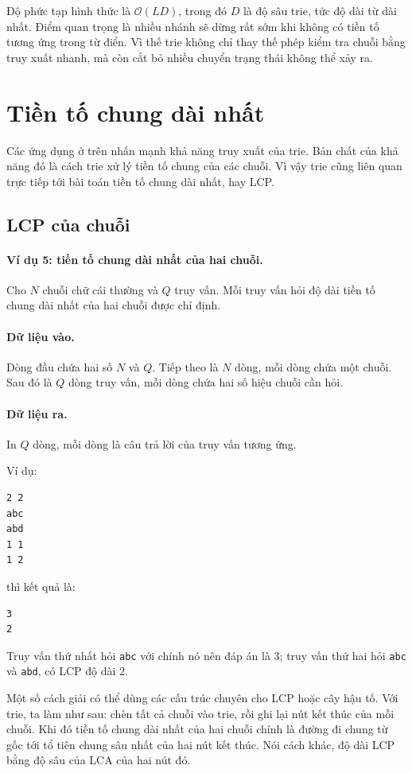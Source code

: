 \documentclass[11pt]{article}
\newcommand{\Oh}{\mathcal{O}}
\begin{document}
Độ phức tạp hình thức là \(\Oh(LD)\), trong đó \(D\) là độ sâu trie, tức độ
dài từ dài nhất. Điểm quan trọng là nhiều nhánh sẽ dừng rất sớm khi không có
tiền tố tương ứng trong từ điển. Vì thế trie không chỉ thay thế phép kiểm tra
chuỗi bằng truy xuất nhanh, mà còn cắt bỏ nhiều chuyển trạng thái không thể
xảy ra.

\section{Tiền tố chung dài nhất}

Các ứng dụng ở trên nhấn mạnh khả năng truy xuất của trie. Bản chất của khả
năng đó là cách trie xử lý tiền tố chung của các chuỗi. Vì vậy trie cũng liên
quan trực tiếp tới bài toán tiền tố chung dài nhất, hay LCP.

\subsection{LCP của chuỗi}

\paragraph{Ví dụ 5: tiền tố chung dài nhất của hai chuỗi.}
Cho \(N\) chuỗi chữ cái thường và \(Q\) truy vấn. Mỗi truy vấn hỏi độ dài tiền
tố chung dài nhất của hai chuỗi được chỉ định.

\paragraph{Dữ liệu vào.}
Dòng đầu chứa hai số \(N\) và \(Q\). Tiếp theo là \(N\) dòng, mỗi dòng chứa
một chuỗi. Sau đó là \(Q\) dòng truy vấn, mỗi dòng chứa hai số hiệu chuỗi cần
hỏi.

\paragraph{Dữ liệu ra.}
In \(Q\) dòng, mỗi dòng là câu trả lời của truy vấn tương ứng.

Ví dụ:
\begin{verbatim}
2 2
abc
abd
1 1
1 2
\end{verbatim}
thì kết quả là:
\begin{verbatim}
3
2
\end{verbatim}
Truy vấn thứ nhất hỏi \texttt{abc} với chính nó nên đáp án là \(3\); truy vấn
thứ hai hỏi \texttt{abc} và \texttt{abd}, có LCP độ dài \(2\).

Một số cách giải có thể dùng các cấu trúc chuyên cho LCP hoặc cây hậu tố. Với
trie, ta làm như sau: chèn tất cả chuỗi vào trie, rồi ghi lại nút kết thúc của
mỗi chuỗi. Khi đó tiền tố chung dài nhất của hai chuỗi chính là đường đi chung
từ gốc tới tổ tiên chung sâu nhất của hai nút kết thúc. Nói cách khác, độ dài
LCP bằng độ sâu của LCA của hai nút đó.
\end{document}
